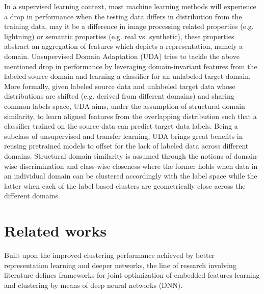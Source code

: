 \documentclass[runningheads]{llncs}
\begin{document}
In a supervised learning context, most machine learning methods will experience a drop in performance when the testing data differs in distribution from the training data, may it be a difference in image processing related properties (e.g. lightning) or semantic properties (e.g.  real vs. synthetic), these properties abstract an aggregation of features which depicts a representation, namely a domain. Unsupervised Domain Adaptation (UDA) tries to tackle the above mentioned drop in performance by leveraging domain-invariant features from the labeled source domain and learning a classifier for an unlabeled target domain. More formally, given labeled source data and unlabeled target data whose distributions are shifted (e.g. derived from different domains) and sharing common labels space, UDA aims, under the assumption of structural domain similarity, to learn aligned features from the overlapping distribution such that a classifier trained on the source data can predict target data labels. Being a subclass of unsupervised and transfer learning, UDA brings great benefits in reusing pretrained models to offset for the lack of labeled data across different domains. Structural domain similarity is assumed through the notions of domain-wise discrimination and class-wise closeness \cite{3} where the former holds when data in an individual domain can be clustered accordingly with the label space while the latter when each of the label based clusters are geometrically close across the different domains.

\section*{Related works}
Built upon the improved clustering performance achieved by better representation learning and deeper networks, the line of research involving \cite{7,15} literature defines frameworks for joint optimization of embedded features learning and clustering by means of deep neural networks (DNN).
\end{document}
